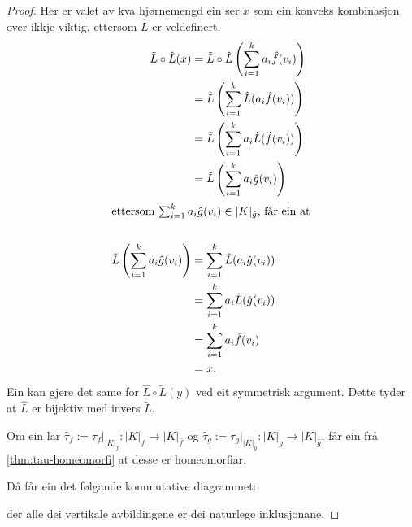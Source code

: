 \documentclass[a4paper, 12pt, norsk]{article}
\theoremstyle{plain}
\theoremstyle{definition}
\newcommand{\Rb}{\mathbb{R}}
\newcommand{\gr}[1]{ \lvert #1 \rvert } %
\begin{document}
\begin{proof}
	Her er valet av kva hjørnemengd ein ser \( x \) som ein konveks kombinasjon over ikkje viktig, ettersom $\hat{L}$ er veldefinert.
	\begin{align*}
		\tilde{L}\circ \hat{L}(x) &= \tilde{L}\circ \hat{L}\left(\sum_{i=1}^ka_i\hat{f}(v_i)\right) \\
		&= \tilde{L}\left(\sum_{i=1}^k\hat{L}(a_i\hat{f}(v_i))\right) \\
		&= \tilde{L}\left(\sum_{i=1}^ka_i\hat{L}(\hat{f}(v_i))\right) \\
		&= \tilde{L}\left(\sum_{i=1}^ka_i\hat{g}(v_i)\right) \\
		\intertext{ettersom $\sum_{i=1}^ka_i\hat{g}(v_i)\in\gr{K}_{\hat{g}}$, får ein at} \\
		\tilde{L}\left(\sum_{i=1}^ka_i\hat{g}(v_i)\right) &= \sum_{i=1}^k\tilde{L}(a_i\hat{g}(v_i)) \\
		&= \sum_{i=1}^ka_i\tilde{L}(\hat{g}(v_i)) \\
		&= \sum_{i=1}^ka_i\hat{f}(v_i) \\
		&= x.
	\end{align*}
	Ein kan gjere det same for $\hat{L}\circ\tilde{L}(y)$ ved eit symmetrisk argument. Dette tyder at $\hat{L}$ er bijektiv med invers $\tilde{L}$.
	
	Om ein lar $\hat{\tau}_f:=\tau_f|_{\gr{K}_f} : \gr{K}_f \to \gr{K}_{\hat{f}}$ og $\hat{\tau}_g:=\tau_g|_{\gr{K}_g} : \gr{K}_g \to \gr{K}_{\hat{g}}$, får ein frå \autoref{thm:tau-homeomorfi} at desse er homeomorfiar.
	
	Då får ein det følgande kommutative diagrammet:
	\begin{center} %
	\end{center}
	der alle dei vertikale avbildingene er dei naturlege inklusjonane.


\end{proof}
\end{document}
